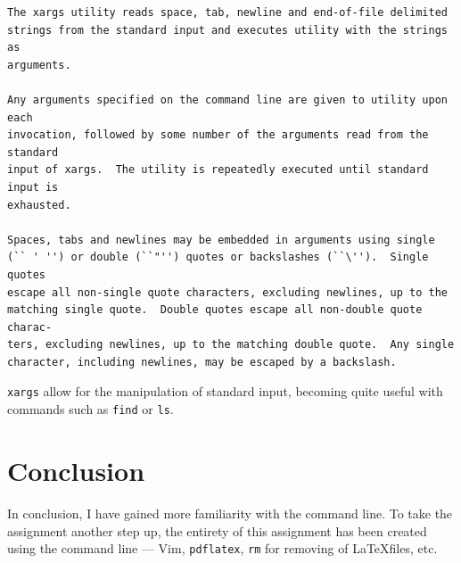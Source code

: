 \documentclass{article}
\newcommand{\shellcmd}[1]{\texttt{\colorbox{gray!30}{#1}}}
\begin{document}
\begin{verbatim}
The xargs utility reads space, tab, newline and end-of-file delimited
strings from the standard input and executes utility with the strings as
arguments.

Any arguments specified on the command line are given to utility upon each
invocation, followed by some number of the arguments read from the standard
input of xargs.  The utility is repeatedly executed until standard input is
exhausted.

Spaces, tabs and newlines may be embedded in arguments using single
(`` ' '') or double (``"'') quotes or backslashes (``\'').  Single quotes
escape all non-single quote characters, excluding newlines, up to the
matching single quote.  Double quotes escape all non-double quote charac-
ters, excluding newlines, up to the matching double quote.  Any single
character, including newlines, may be escaped by a backslash.
\end{verbatim}

\shellcmd{xargs} allow for the manipulation of standard input, becoming quite useful with commands such as \shellcmd{find} or \shellcmd{ls}.

\section{Conclusion}
In conclusion, I have gained more familiarity with the command line. To take the assignment another step up, the entirety of this assignment has been created using the command line — Vim, \texttt{pdflatex}, \texttt{rm} for removing of \LaTeX files, etc.
\end{document}
